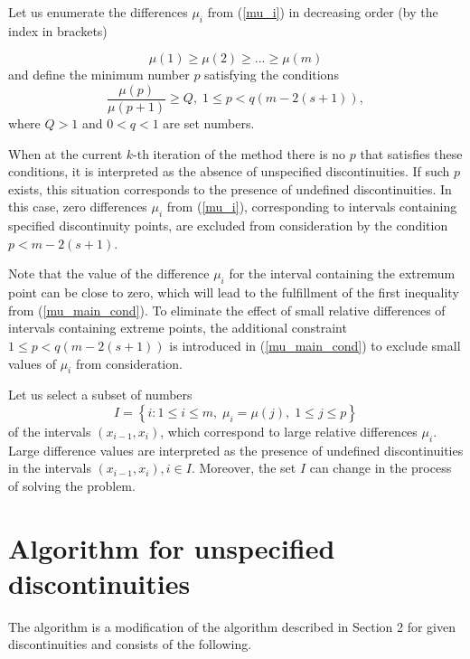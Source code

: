 \documentclass[runningheads]{llncs}
\begin{document}
Let us enumerate the differences $\mu_i$ from (\ref{mu_i}) in decreasing order (by the index in brackets)

\begin{equation}\label{mu_cond}
\mu(1) \geq \mu(2) \geq ... \geq \mu(m)
\end{equation}
and define the minimum number $p$ satisfying the conditions
\begin{equation}\label{mu_main_cond}
 \frac{\mu(p)}{\mu(p+1)} \geq Q, \; 1 \leq p < q(m-2(s+1)),
\end{equation}
where $Q>1$ and $0<q<1$ are set numbers.

When at the current $k$-th iteration of the method there is no $p$ that satisfies these conditions, it is interpreted as the absence of unspecified discontinuities. If such $p$ exists, this situation corresponds to the presence of undefined discontinuities. In this case, zero differences $\mu_i$ from (\ref{mu_i}), corresponding to intervals containing specified discontinuity points, are excluded from consideration by the condition $p<m-2(s+1)$.

Note that the value of the difference $\mu_i$ for the interval containing the extremum point can be close to zero, which will lead to the fulfillment of the first inequality from (\ref{mu_main_cond}). To eliminate the effect of small relative differences of intervals containing extreme points, the additional constraint $1 \leq p < q(m-2(s+1))$ is introduced in (\ref{mu_main_cond}) to exclude small values of $\mu_i$ from consideration.

Let us select a subset of numbers
\begin{equation}\label{set_I}
I=\left\{ i:1 \leq i \leq m, \; \mu_i=\mu(j), \; 1 \leq j \leq p\right\}
\end{equation}
of the intervals $(x_{i-1},x_i)$, which correspond to large relative differences $\mu_i$. Large difference values are interpreted as the presence of undefined discontinuities in the intervals $(x_{i-1},x_i), i \in I$. Moreover, the set $I$ can change in the process of solving the problem.

\section{Algorithm for unspecified discontinuities}

The algorithm is a modification of the algorithm described in Section 2 for given discontinuities and consists of the following. 
\end{document}
